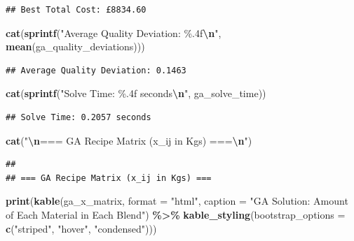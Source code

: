 \documentclass[
]{article}
\newenvironment{Shaded}{\begin{snugshade}}{\end{snugshade}}
\newcommand{\AttributeTok}[1]{\textcolor[rgb]{0.13,0.29,0.53}{#1}}
\newcommand{\FunctionTok}[1]{\textcolor[rgb]{0.13,0.29,0.53}{\textbf{#1}}}
\newcommand{\NormalTok}[1]{#1}
\newcommand{\SpecialCharTok}[1]{\textcolor[rgb]{0.81,0.36,0.00}{\textbf{#1}}}
\newcommand{\StringTok}[1]{\textcolor[rgb]{0.31,0.60,0.02}{#1}}
\begin{document}
\begin{verbatim}
## Best Total Cost: £8834.60
\end{verbatim}

\begin{Shaded}
\begin{Highlighting}[]
\FunctionTok{cat}\NormalTok{(}\FunctionTok{sprintf}\NormalTok{(}\StringTok{"Average Quality Deviation: \%.4f}\SpecialCharTok{\textbackslash{}n}\StringTok{"}\NormalTok{, }\FunctionTok{mean}\NormalTok{(ga\_quality\_deviations)))}
\end{Highlighting}
\end{Shaded}

\begin{verbatim}
## Average Quality Deviation: 0.1463
\end{verbatim}

\begin{Shaded}
\begin{Highlighting}[]
\FunctionTok{cat}\NormalTok{(}\FunctionTok{sprintf}\NormalTok{(}\StringTok{"Solve Time: \%.4f seconds}\SpecialCharTok{\textbackslash{}n}\StringTok{"}\NormalTok{, ga\_solve\_time))}
\end{Highlighting}
\end{Shaded}

\begin{verbatim}
## Solve Time: 0.2057 seconds
\end{verbatim}

\begin{Shaded}
\begin{Highlighting}[]
\FunctionTok{cat}\NormalTok{(}\StringTok{"}\SpecialCharTok{\textbackslash{}n}\StringTok{=== GA Recipe Matrix (x\_ij in Kgs) ===}\SpecialCharTok{\textbackslash{}n}\StringTok{"}\NormalTok{)}
\end{Highlighting}
\end{Shaded}

\begin{verbatim}
## 
## === GA Recipe Matrix (x_ij in Kgs) ===
\end{verbatim}

\begin{Shaded}
\begin{Highlighting}[]
\FunctionTok{print}\NormalTok{(}\FunctionTok{kable}\NormalTok{(ga\_x\_matrix, }\AttributeTok{format =} \StringTok{"html"}\NormalTok{, }
            \AttributeTok{caption =} \StringTok{"GA Solution: Amount of Each Material in Each Blend"}\NormalTok{) }\SpecialCharTok{\%\textgreater{}\%}
      \FunctionTok{kable\_styling}\NormalTok{(}\AttributeTok{bootstrap\_options =} \FunctionTok{c}\NormalTok{(}\StringTok{"striped"}\NormalTok{, }\StringTok{"hover"}\NormalTok{, }\StringTok{"condensed"}\NormalTok{)))}
\end{Highlighting}
\end{Shaded}
\end{document}
